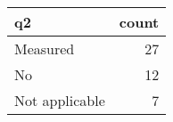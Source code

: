 \begin{tabular}{lr}
\toprule
             q2 &  count \\
\midrule
       Measured &     27 \\
             No &     12 \\
 Not applicable &      7 \\
\bottomrule
\end{tabular}
